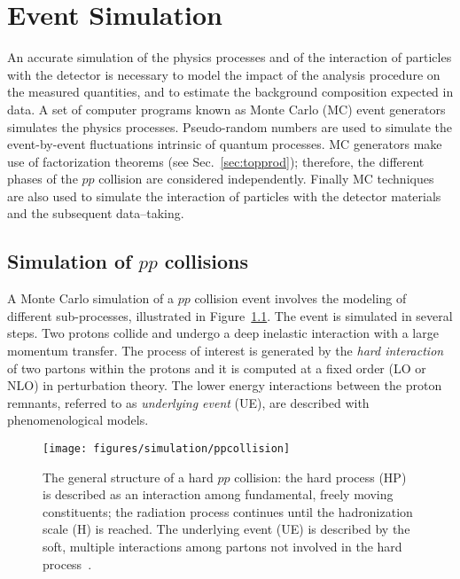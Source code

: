\chapter{Event Simulation}
\label{sec:simulation}

An accurate simulation of the physics processes and of the interaction
of particles with the detector is necessary to model the impact of the
analysis procedure on the measured quantities, and to estimate the
background composition expected in data. A set of computer programs
known as Monte Carlo (MC) event generators simulates the physics
processes.
Pseudo-random numbers are used to simulate the event-by-event
fluctuations intrinsic of quantum processes. MC generators make use of
factorization theorems (see Sec.~\ref{sec:topprod}); therefore, the
different phases of the $pp$ collision are considered independently.
Finally MC techniques are also used to simulate the interaction of
particles with the detector materials and the subsequent data--taking.

\section{Simulation of $pp$ collisions}
\label{sec:MCsimulation}

A Monte Carlo simulation of a $pp$ collision event involves the
modeling of different sub-processes, illustrated in
Figure~\ref{fig:collision}.
The event is simulated in several steps. Two protons collide and
undergo a deep inelastic interaction with a large momentum transfer.
The process of interest is generated by the {\it hard interaction} of
two partons within the protons and it is computed at a fixed order (LO
or NLO) in perturbation theory. 
The lower energy interactions between the proton remnants,
referred to as {\it underlying event} (UE), are described with
phenomenological models.

\begin{figure}[ht]
  \begin{center}
    \texttt{[image: figures/simulation/ppcollision]}
    \caption[General structure of a hard $pp$ collision]{
      The general structure of a hard $pp$ collision: the hard process
      (HP) is described as an interaction among fundamental, freely
      moving constituents; the radiation process continues until the
      hadronization scale (H) is reached. The underlying event (UE) is
    described by the soft, multiple interactions among partons not
    involved in the hard process~\cite{mangano2005}.}
    \label{fig:collision}
  \end{center}
\end{figure}

